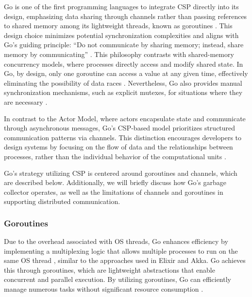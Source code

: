 Go is one of the first programming languages to integrate \gls{CSP} directly into its design, emphasizing data sharing through channels rather than passing references to shared memory among its lightweight threads, known as goroutines \cite{Cox-Buday2017}. This design choice minimizes potential synchronization complexities and aligns with Go’s guiding principle: “Do not communicate by sharing memory; instead, share memory by communicating” \cite{akka-docs}. This philosophy contrasts with shared-memory concurrency models, where processes directly access and modify shared state. In Go, by design, only one goroutine can access a value at any given time, effectively eliminating the possibility of data races \cite{Kennedy2016,akka-docs}. Nevertheless, Go also provides manual synchronization mechanisms, such as explicit mutexes, for situations where they are necessary \cite{Cox-Buday2017}.

In contrast to the Actor Model, where actors encapsulate state and communicate through asynchronous messages, Go’s \gls{CSP}-based model prioritizes structured communication patterns via channels. This distinction encourages developers to design systems by focusing on the flow of data and the relationships between processes, rather than the individual behavior of the computational units \cite{akka-docs}.

Go's strategy utilizing \gls{CSP} is centered around goroutines and channels, which are described below. Additionally, we will briefly discuss how Go's garbage collector operates, as well as the limitations of channels and goroutines in supporting distributed communication.

\subsubsection{Goroutines}

Due to the overhead associated with \gls{OS} threads, Go enhances efficiency by implementing a multiplexing logic that allows multiple processes to run on the same \gls{OS} thread \cite{Cox-Buday2017,Castro2019}, similar to the approaches used in Elixir and Akka. Go achieves this through goroutines, which are lightweight abstractions that enable concurrent and parallel execution. By utilizing goroutines, Go can efficiently manage numerous tasks without significant resource consumption \cite{akka-docs}.

